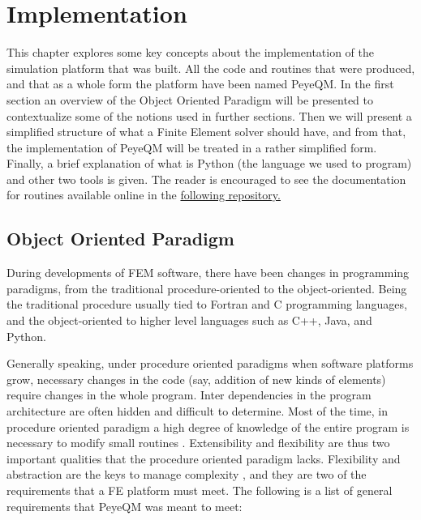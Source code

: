 \chapter{Implementation}
\label{ch:Implementation}

This chapter explores some key concepts about the implementation of the simulation platform that was built. 
All the code and routines that were produced, and that as a whole form the platform have been named PeyeQM.  
In the first section an overview of the Object Oriented Paradigm will be presented to contextualize some of the notions used in further sections. Then we will present a simplified structure of what a Finite Element solver should have, and from that, the implementation of PeyeQM will be treated in a rather simplified form. Finally, a brief explanation of what is Python (the language we used to program) and other two tools is given. The reader is encouraged to see the documentation for routines available online in the \href{https://github.com/bebopsan/peyeQM}{following repository.}
  
\section{Object Oriented Paradigm}

During developments of FEM software, there have been changes in programming paradigms, from the traditional procedure-oriented to the object-oriented. Being the traditional procedure usually tied to  Fortran and C programming languages, and the object-oriented to higher level languages such as C++, Java, and Python.

Generally speaking, under procedure oriented paradigms when software platforms grow, necessary changes in the code (say, addition of new kinds of elements) require changes in the whole program. Inter dependencies  in the program architecture are often hidden and difficult to determine. Most of the time, in procedure oriented paradigm a high degree of knowledge of the entire program is necessary to modify small routines \cite{Mackerle2004}. Extensibility and flexibility are thus two important qualities that the procedure oriented paradigm lacks. 
Flexibility and abstraction are the keys to manage complexity \cite{Lage1998}, and they are two of the requirements that a FE platform must meet. The following is a list of general requirements that PeyeQM was meant to meet:


